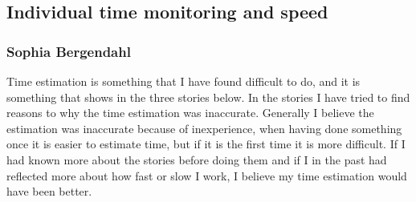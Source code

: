\subsection{Individual time monitoring and speed}
\subsubsection{Sophia Bergendahl}


Time estimation is something that I have found difficult to do, and it is something that shows in the three stories below. In the stories I have tried to find reasons to why the time 
estimation was inaccurate. Generally I believe the estimation was inaccurate because of inexperience, when having done something once it is easier to estimate time, but if it is the first time it 
is more difficult. If I had known more about the stories before doing them and if I in the past had reflected more about how fast or slow I work, I believe my time estimation would have been 
better.


